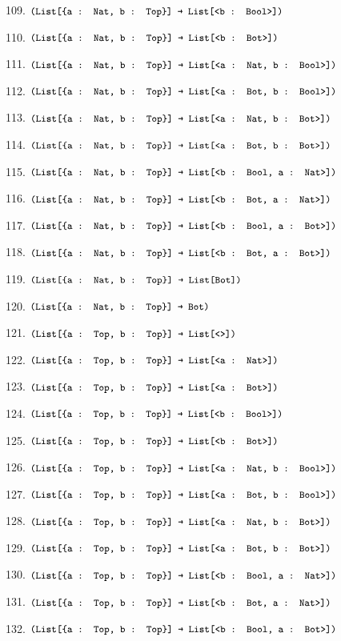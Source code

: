 \documentclass[dvipsnames]{article}
\let\codeOrig\code
\renewcommand{\code}[2][]{%
  \ifmmode
    \if\relax\detokenize{#1}\relax
      \mathchoice{\mbox{\normalfont\small\ttfamily #2}}{\mbox{\normalfont\small\ttfamily #2}}{\mbox{\normalfont\small\ttfamily #2}}{\mbox{\normalfont\small\ttfamily #2}}%
    \else
      \mathchoice{\mbox{\normalfont\small\ttfamily #2}}{\mbox{\normalfont\small\ttfamily #2}}{\mbox{\normalfont\small\ttfamily #2}}{\mbox{\normalfont\small\ttfamily #2}}%
    \fi
  \else
    \codeOrig[#1]{#2}%
  \fi}
\begin{document}
\begin{enumerate}
      109. $\code{(List[\{a : Nat, b : Top\}] → List[<b : Bool>])}$

      110. $\code{(List[\{a : Nat, b : Top\}] → List[<b : Bot>])}$

      111. $\code{(List[\{a : Nat, b : Top\}] → List[<a : Nat, b : Bool>])}$

      112. $\code{(List[\{a : Nat, b : Top\}] → List[<a : Bot, b : Bool>])}$

      113. $\code{(List[\{a : Nat, b : Top\}] → List[<a : Nat, b : Bot>])}$

      114. $\code{(List[\{a : Nat, b : Top\}] → List[<a : Bot, b : Bot>])}$

      115. $\code{(List[\{a : Nat, b : Top\}] → List[<b : Bool, a : Nat>])}$

      116. $\code{(List[\{a : Nat, b : Top\}] → List[<b : Bot, a : Nat>])}$

      117. $\code{(List[\{a : Nat, b : Top\}] → List[<b : Bool, a : Bot>])}$

      118. $\code{(List[\{a : Nat, b : Top\}] → List[<b : Bot, a : Bot>])}$

      119. $\code{(List[\{a : Nat, b : Top\}] → List[Bot])}$

      120. $\code{(List[\{a : Nat, b : Top\}] → Bot)}$

      121. $\code{(List[\{a : Top, b : Top\}] → List[<>])}$

      122. $\code{(List[\{a : Top, b : Top\}] → List[<a : Nat>])}$

      123. $\code{(List[\{a : Top, b : Top\}] → List[<a : Bot>])}$

      124. $\code{(List[\{a : Top, b : Top\}] → List[<b : Bool>])}$

      125. $\code{(List[\{a : Top, b : Top\}] → List[<b : Bot>])}$

      126. $\code{(List[\{a : Top, b : Top\}] → List[<a : Nat, b : Bool>])}$

      127. $\code{(List[\{a : Top, b : Top\}] → List[<a : Bot, b : Bool>])}$

      128. $\code{(List[\{a : Top, b : Top\}] → List[<a : Nat, b : Bot>])}$

      129. $\code{(List[\{a : Top, b : Top\}] → List[<a : Bot, b : Bot>])}$

      130. $\code{(List[\{a : Top, b : Top\}] → List[<b : Bool, a : Nat>])}$

      131. $\code{(List[\{a : Top, b : Top\}] → List[<b : Bot, a : Nat>])}$

      132. $\code{(List[\{a : Top, b : Top\}] → List[<b : Bool, a : Bot>])}$


\end{enumerate}
\end{document}
